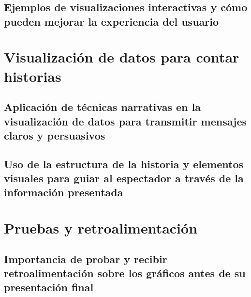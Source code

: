 \documentclass[
  a4paper,
]{article}
\begin{document}
\hypertarget{ejemplos-de-visualizaciones-interactivas-y-cuxf3mo-pueden-mejorar-la-experiencia-del-usuario}{%
\subsection{Ejemplos de visualizaciones interactivas y cómo pueden
mejorar la experiencia del
usuario}\label{ejemplos-de-visualizaciones-interactivas-y-cuxf3mo-pueden-mejorar-la-experiencia-del-usuario}}

\hypertarget{visualizaciuxf3n-de-datos-para-contar-historias}{%
\section{Visualización de datos para contar
historias}\label{visualizaciuxf3n-de-datos-para-contar-historias}}

\hypertarget{aplicaciuxf3n-de-tuxe9cnicas-narrativas-en-la-visualizaciuxf3n-de-datos-para-transmitir-mensajes-claros-y-persuasivos}{%
\subsection{Aplicación de técnicas narrativas en la visualización de
datos para transmitir mensajes claros y
persuasivos}\label{aplicaciuxf3n-de-tuxe9cnicas-narrativas-en-la-visualizaciuxf3n-de-datos-para-transmitir-mensajes-claros-y-persuasivos}}

\hypertarget{uso-de-la-estructura-de-la-historia-y-elementos-visuales-para-guiar-al-espectador-a-travuxe9s-de-la-informaciuxf3n-presentada}{%
\subsection{Uso de la estructura de la historia y elementos visuales
para guiar al espectador a través de la información
presentada}\label{uso-de-la-estructura-de-la-historia-y-elementos-visuales-para-guiar-al-espectador-a-travuxe9s-de-la-informaciuxf3n-presentada}}

\hypertarget{pruebas-y-retroalimentaciuxf3n}{%
\section{Pruebas y
retroalimentación}\label{pruebas-y-retroalimentaciuxf3n}}

\hypertarget{importancia-de-probar-y-recibir-retroalimentaciuxf3n-sobre-los-gruxe1ficos-antes-de-su-presentaciuxf3n-final}{%
\subsection{Importancia de probar y recibir retroalimentación sobre los
gráficos antes de su presentación
final}\label{importancia-de-probar-y-recibir-retroalimentaciuxf3n-sobre-los-gruxe1ficos-antes-de-su-presentaciuxf3n-final}}
\end{document}
